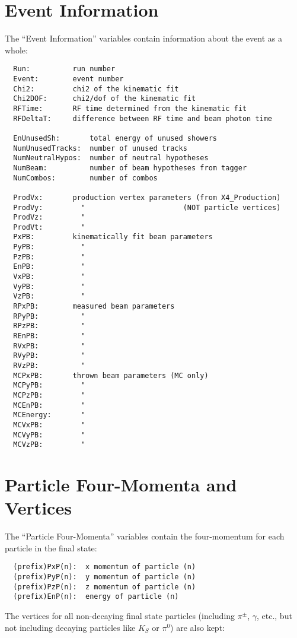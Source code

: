\documentclass[11pt]{article}
\begin{document}
\section{Event Information}

The ``Event Information'' variables contain information about the event as a whole:

\begin{verbatim}
  Run:          run number
  Event:        event number
  Chi2:         chi2 of the kinematic fit
  Chi2DOF:      chi2/dof of the kinematic fit
  RFTime:       RF time determined from the kinematic fit
  RFDeltaT:     difference between RF time and beam photon time

  EnUnusedSh:       total energy of unused showers
  NumUnusedTracks:  number of unused tracks
  NumNeutralHypos:  number of neutral hypotheses
  NumBeam:          number of beam hypotheses from tagger
  NumCombos:        number of combos

  ProdVx:       production vertex parameters (from X4_Production)
  ProdVy:         "                       (NOT particle vertices)
  ProdVz:         "
  ProdVt:         "
  PxPB:         kinematically fit beam parameters
  PyPB:           "
  PzPB:           "
  EnPB:           "
  VxPB:           "
  VyPB:           "
  VzPB:           "
  RPxPB:        measured beam parameters
  RPyPB:          "
  RPzPB:          "
  REnPB:          "
  RVxPB:          "
  RVyPB:          "
  RVzPB:          "
  MCPxPB:       thrown beam parameters (MC only)
  MCPyPB:         "
  MCPzPB:         "
  MCEnPB:         "
  MCEnergy:       "
  MCVxPB:         "
  MCVyPB:         "
  MCVzPB:         "
\end{verbatim}



\section{Particle Four-Momenta and Vertices}
\label{sec:nt:momentum}

The ``Particle Four-Momenta'' variables contain the four-momentum for each particle in the final state:

\begin{verbatim}
  (prefix)PxP(n):  x momentum of particle (n)
  (prefix)PyP(n):  y momentum of particle (n)
  (prefix)PzP(n):  z momentum of particle (n)
  (prefix)EnP(n):  energy of particle (n)
\end{verbatim}

The vertices for all non-decaying final state particles (including $\pi^\pm$, $\gamma$, etc., but not including decaying particles like $K_S$ or $\pi^0$) are also kept:
\end{document}
